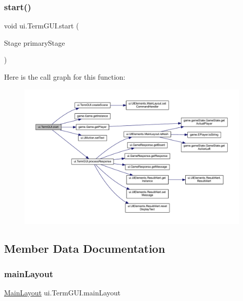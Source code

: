 \subsubsection{\texorpdfstring{start()}{start()}}
{\footnotesize\ttfamily void ui.\+Term\+G\+U\+I.\+start (\begin{DoxyParamCaption}\item[{Stage}]{primary\+Stage }\end{DoxyParamCaption})\hspace{0.3cm}{\ttfamily [inline]}}

Here is the call graph for this function\+:
\nopagebreak
\begin{figure}[H]
\begin{center}
\leavevmode
\includegraphics[width=350pt]{classui_1_1_term_g_u_i_a46859d29835a7053b48e49f27b377f76_cgraph}
\end{center}
\end{figure}


\subsection{Member Data Documentation}
\mbox{\label{classui_1_1_term_g_u_i_a82f6077413341f13111d4a8705e6cff0}} 
\subsubsection{\texorpdfstring{main\+Layout}{mainLayout}}
{\footnotesize\ttfamily \mbox{\hyperlink{classui_1_1_u_i_elements_1_1_main_layout}{Main\+Layout}} ui.\+Term\+G\+U\+I.\+main\+Layout\hspace{0.3cm}{\ttfamily [private]}}

